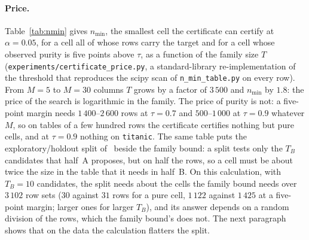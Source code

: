 \documentclass[11pt]{article}
\begin{document}
\paragraph{Price.} Table~\ref{tab:nmin} gives $n_{\min}$, the smallest cell the certificate can certify at $\alpha=0.05$, for a cell all of whose rows carry the target and for a cell whose observed purity is five points above $\tau$, as a function of the family size $T$ (\texttt{experiments/certificate\_price.py}, a standard-library re-implementation of the threshold that reproduces the scipy scan of \texttt{n\_min\_table.py} on every row). From $M=5$ to $M=30$ columns $T$ grows by a factor of $3\,500$ and $n_{\min}$ by $1.8$: the price of the search is logarithmic in the family. The price of purity is not: a five-point margin needs $1\,400$--$2\,600$ rows at $\tau=0.7$ and $500$--$1\,000$ at $\tau=0.9$ whatever $M$, so on tables of a few hundred rows the certificate certifies nothing but pure cells, and at $\tau=0.9$ nothing on \texttt{titanic}. The same table puts the exploratory/holdout split of~\citet{webb2007} beside the family bound: a split tests only the $T_B$ candidates that half~A proposes, but on half the rows, so a cell must be about twice the size in the table that it needs in half~B. On this calculation, with $T_B=10$ candidates, the split needs about the cells the family bound needs over $3\,102$ row sets ($30$ against $31$ rows for a pure cell, $1\,122$ against $1\,425$ at a five-point margin; larger ones for larger $T_B$), and its answer depends on a random division of the rows, which the family bound's does not. The next paragraph shows that on the data the calculation flatters the split.

\begin{table}[t]\centering\footnotesize\setlength{\tabcolsep}{3.5pt}
\caption{Smallest certifiable cell $n_{\min}$ at $\alpha=0.05$, pure / observed purity $\tau+0.05$, for the family certificate ($T$ distinct row sets over $d\le4$ on all rows) and for the exploratory/holdout split with $T_B$ candidates (rows in the whole table, twice the rows half~B needs). Generated by \texttt{experiments/certificate\_price.py}.}\label{tab:nmin}

\end{table}
\end{document}
